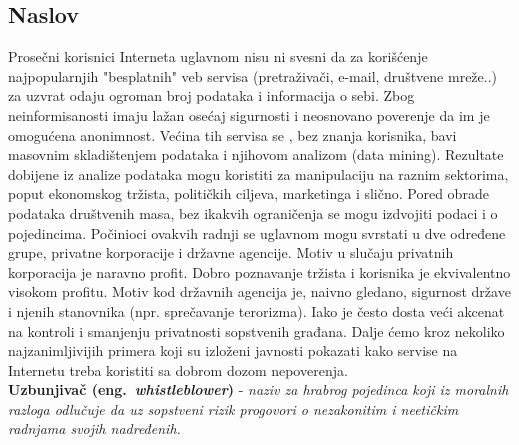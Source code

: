 \documentclass[a4paper]{article}
\begin{document}
\subsection{Naslov}
\label{subsec:podnaslovIP4}

	Prosečni korisnici Interneta uglavnom nisu ni svesni da za korišćenje najpopularnjih "besplatnih" veb servisa (pretraživači, e-mail, društvene mreže..) za uzvrat odaju ogroman broj podataka i informacija o sebi. Zbog neinformisanosti imaju lažan osećaj sigurnosti i neosnovano poverenje da im je omogućena anonimnost. Većina tih servisa se , bez znanja korisnika,  bavi masovnim skladištenjem podataka i njihovom analizom (data mining). Rezultate dobijene iz analize podataka mogu koristiti za manipulaciju na raznim sektorima, poput ekonomskog tržista, političkih ciljeva, marketinga i slično. Pored obrade podataka društvenih masa, bez ikakvih ograničenja se mogu izdvojiti podaci i o pojedincima.
	Počinioci ovakvih radnji se uglavnom mogu svrstati u dve određene grupe, privatne korporacije i državne agencije. Motiv u slučaju privatnih korporacija je naravno profit. Dobro poznavanje tržista i korisnika je ekvivalentno visokom profitu. Motiv kod državnih agencija je, naivno gledano, sigurnost države i njenih stanovnika (npr. sprečavanje terorizma). Iako je često dosta veći akcenat na kontroli i smanjenju privatnosti sopstvenih građana. Dalje ćemo kroz nekoliko najzanimljivijih primera koji su izloženi javnosti pokazati kako servise na Internetu treba koristiti sa dobrom dozom nepoverenja.
\\

\textbf{Uzbunjivač (eng.~{\em whistleblower})} - \textit{naziv za hrabrog pojedinca koji iz moralnih razloga odlučuje da uz sopstveni rizik progovori o nezakonitim i neetičkim radnjama svojih nadređenih.} \cite{?}
\\
\end{document}

